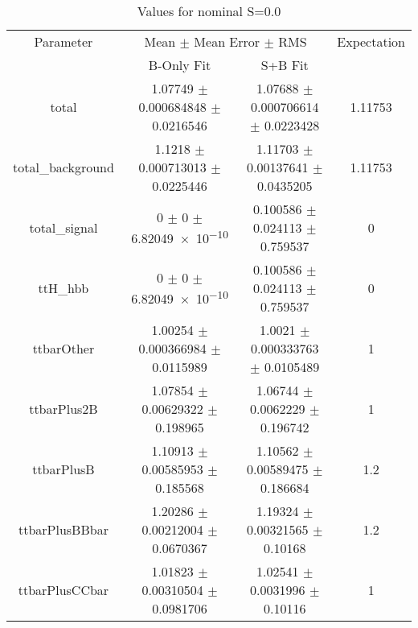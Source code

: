 \begin{table}
\centering
\caption{Values for nominal S=0.0}
\begin{tabular}{cccc}
\toprule
Parameter & \multicolumn{2}{c}{Mean $\pm$ Mean Error $\pm$ RMS} & Expectation\\
 & B-Only Fit & S+B Fit & \\
\midrule
total & \num{1.07749} $\pm$ \num{0.000684848} $\pm$ \num{0.0216546} & \num{1.07688} $\pm$ \num{0.000706614} $\pm$ \num{0.0223428} & \num{1.11753}\\
total\_background & \num{1.1218} $\pm$ \num{0.000713013} $\pm$ \num{0.0225446} & \num{1.11703} $\pm$ \num{0.00137641} $\pm$ \num{0.0435205} & \num{1.11753}\\
total\_signal & \num{0} $\pm$ \num{0} $\pm$ \num{6.82049e-10} & \num{0.100586} $\pm$ \num{0.024113} $\pm$ \num{0.759537} & \num{0}\\
ttH\_hbb & \num{0} $\pm$ \num{0} $\pm$ \num{6.82049e-10} & \num{0.100586} $\pm$ \num{0.024113} $\pm$ \num{0.759537} & \num{0}\\
ttbarOther & \num{1.00254} $\pm$ \num{0.000366984} $\pm$ \num{0.0115989} & \num{1.0021} $\pm$ \num{0.000333763} $\pm$ \num{0.0105489} & \num{1}\\
ttbarPlus2B & \num{1.07854} $\pm$ \num{0.00629322} $\pm$ \num{0.198965} & \num{1.06744} $\pm$ \num{0.0062229} $\pm$ \num{0.196742} & \num{1}\\
ttbarPlusB & \num{1.10913} $\pm$ \num{0.00585953} $\pm$ \num{0.185568} & \num{1.10562} $\pm$ \num{0.00589475} $\pm$ \num{0.186684} & \num{1.2}\\
ttbarPlusBBbar & \num{1.20286} $\pm$ \num{0.00212004} $\pm$ \num{0.0670367} & \num{1.19324} $\pm$ \num{0.00321565} $\pm$ \num{0.10168} & \num{1.2}\\
ttbarPlusCCbar & \num{1.01823} $\pm$ \num{0.00310504} $\pm$ \num{0.0981706} & \num{1.02541} $\pm$ \num{0.0031996} $\pm$ \num{0.10116} & \num{1}\\
\bottomrule
\end{tabular}
\end{table}